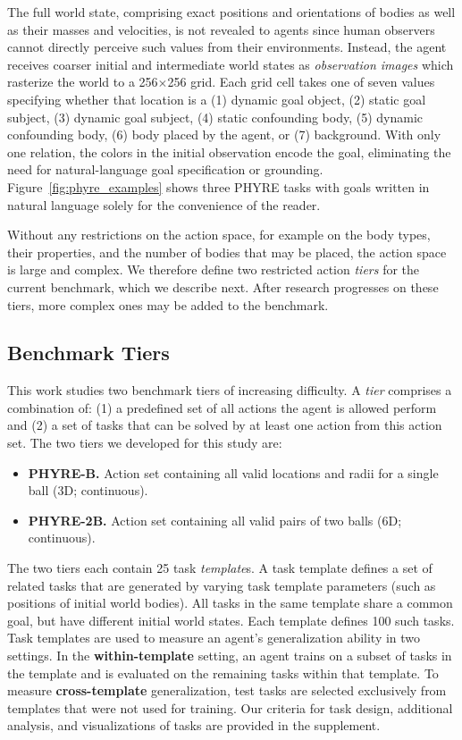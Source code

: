 \documentclass{article}
\begin{document}
The full world state, comprising exact positions and orientations of bodies as well as their masses and velocities, is not revealed to agents since human observers cannot directly perceive such values from their environments.
Instead, the agent receives coarser initial and intermediate world states as \emph{observation images} which rasterize the world to a 256$\times$256 grid. Each grid cell takes one of seven values specifying whether that location is a (1) dynamic goal object, (2) static goal subject, (3) dynamic goal subject, (4) static confounding body, (5) dynamic confounding body, (6) body placed by the agent, or (7) background. With only one relation, the colors in the initial observation encode the goal, eliminating the need for natural-language goal specification or grounding. Figure~\ref{fig:phyre_examples} shows three PHYRE tasks with goals written in natural language solely for the convenience of the reader.

Without any restrictions on the action space, for example on the body types, their properties, and the number of bodies that may be placed, the action space is large and complex. We therefore define two restricted action \emph{tiers} for the current benchmark, which we describe next. After research progresses on these tiers, more complex ones may be added to the benchmark.

\subsection{Benchmark Tiers}
\label{sec:benchmark_tiers}
This work studies two benchmark tiers of increasing difficulty. A \emph{tier} comprises a combination of: (1) a predefined set of all actions the agent is allowed perform and (2) a set of tasks that can be solved by at least one action from this action set. The two tiers we developed for this study are:
\begin{itemize}[leftmargin=*]
\setlength\itemsep{0em}
\item \textbf{PHYRE-B.} Action set containing all valid locations and radii for a single ball (3D; continuous).
\item \textbf{PHYRE-2B.} Action set containing all valid pairs of two balls (6D; continuous).
\end{itemize}
The two tiers each contain 25 task \emph{template}s. A task template defines a set of related tasks that are generated by varying task template parameters (such as positions of initial world bodies). All tasks in the same template share a common goal, but have different initial world states. Each template defines 100 such tasks. Task templates are used to measure an agent's generalization ability in two settings. In the \textbf{within-template} setting, an agent trains on a subset of tasks in the template and is evaluated on the remaining tasks within that template. To measure \textbf{cross-template} generalization, test tasks are selected exclusively from templates that were not used for training. Our criteria for task design, additional analysis, and visualizations of tasks are provided in the supplement.
\end{document}
